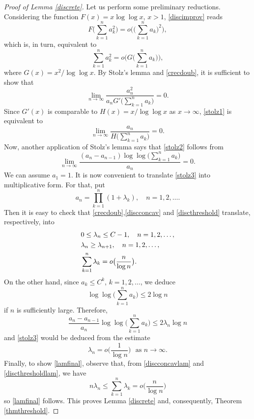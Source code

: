 \documentclass[11pt,letterpaper]{amsart}
\theoremstyle{definition}
\numberwithin{equation}{section}
\begin{document}
\begin{proof}[Proof of Lemma \ref{discrete}] Let us perform some preliminary reductions. Considering the function $F(x) = x \log \log x$, $x>1$,  \eqref{discimprov} reads 
$$
F \big ( \sum_{k=1}^n a_k^2  \big ) = o \Big ( \big ( \sum_{k=1}^n a_k  \big )^2 \Big ) , 
$$
which is, in turn, equivalent to
$$
\sum_{k=1}^n a_k^2  = o \Big ( G \big ( \sum_{k=1}^n a_k  \big ) \Big ) , 
$$
where $\displaystyle G(x) = x^2 / \log \log x$. By Stolz's lemma and \eqref{crecdoub},  it is sufficient to show that
\begin{equation}\label{stolz1}
\lim_{n\to \infty} \frac{a_n^2}{a_n G' \big ( \sum_{k=1}^n a_k  \Big )} = 0 . 
\end{equation}
Since $\displaystyle G'(x)$ is comparable to  $ H(x) = x / \log \log x $ as $x\to \infty$, \eqref{stolz1} is equivalent to
\begin{equation}\label{stolz2}
\lim_{n\to \infty} \frac{a_n}{H \big ( \sum_{k=1}^n a_k \big )} = 0. 
\end{equation}
Now, another application of Stolz's lemma says that \eqref{stolz2} follows from 
\begin{equation}\label{stolz3}
\lim_{n\to \infty} \frac{(a_n - a_{n-1}) \log \log \big (  \sum_{k=1}^n a_k \big )}{a_n} = 0 . 
\end{equation}
We can assume $a_1 = 1$. It is now convenient to translate \eqref{stolz3} into multiplicative form. For that, put
$$
a_n = \prod_{k=1}^n (1 + \lambda_k ), \quad n=1,2,\ldots .
$$
Then it is easy to check that  \eqref{crecdoub},\eqref{discconcav} and \eqref{discthreshold} translate, respectively, into
\begin{eqnarray}
& 0 \leq \lambda_n \leq C - 1 , \quad n=1,2,\ldots ,  \vspace{0.2cm} \label{crecdoublam}\\
& \lambda_n \geq \lambda_{n+1}, \quad n=1,2, \ldots ,  \vspace{0.2cm} \label{discconcavlam}\\
& \displaystyle \sum_{k=1}^n \lambda_k = \displaystyle o\big ( \frac{n}{\log n}  \big ) .  \label{discthresholdlam}
\end{eqnarray}
On the other hand, since $a_k \leq C^k$, $k=1,2,\ldots$, we deduce
$$
\log \log \big ( \sum_{k=1}^n a_k  \big ) \leq 2 \log n
$$
if $n$ is sufficiently large. Therefore,
$$
\frac{a_n - a_{n-1}}{a_n} \log \log \big ( \sum_{k=1}^n a_k  \big ) \leq  2\lambda_n \log n
$$
and \eqref{stolz3} would be deduced from the estimate
\begin{equation}\label{lamfinal}
\lambda_n = o \big (  \frac{1}{\log n}  \big ) \, \, \, \, \text{as} \, \, n \to \infty . 
\end{equation}
Finally, to show \eqref{lamfinal}, observe that, from \eqref{discconcavlam} and \eqref{discthresholdlam}, we have
$$
n \lambda_n \leq \sum_{k=1}^n \lambda_k = o\big ( \frac{n}{\log n}  \big )
$$
so \eqref{lamfinal} follows. This proves Lemma \ref{discrete} and, consequently, Theorem \ref{thmthreshold}.
\end{proof}
\end{document}
